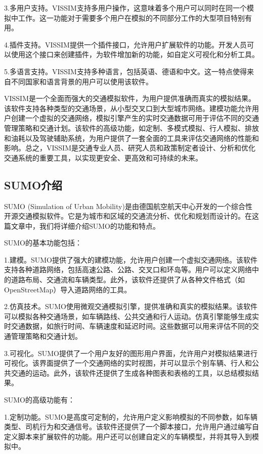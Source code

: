 3.多用户支持。VISSIM支持多用户操作，这意味着多个用户可以同时在同一个模拟中工作。这一功能对于需要多个用户在模拟的不同部分工作的大型项目特别有用。

4.插件支持。VISSIM提供一个插件接口，允许用户扩展软件的功能。开发人员可以使用这个接口来创建插件，为软件增加新的功能，如自定义可视化和分析工具。

5.多语言支持。VISSIM支持多种语言，包括英语、德语和中文。这一特点使得来自不同国家和语言背景的用户可以使用该软件。

VISSIM是一个全面而强大的交通模拟软件，为用户提供准确而真实的模拟结果。该软件支持各种类型的交通场景，从小型交叉口到大型城市网络。建模功能允许用户创建一个虚拟的交通网络，模拟引擎产生的实时交通数据可用于评估不同的交通管理策略和交通计划。该软件的高级功能，如定制、多模式模拟、行人模拟、排放和油耗以及驾驶辅助系统，为用户提供了一套全面的工具来评估交通网络的性能和影响。总之，VISSIM是交通专业人员、研究人员和政策制定者设计、分析和优化交通系统的重要工具，以实现更安全、更高效和可持续的未来。


\subsection{SUMO介绍}

SUMO (Simulation of Urban Mobility)是由德国航空航天中心开发的一个综合性开源交通模拟软件。它是为城市和区域的交通流分析、优化和规划而设计的。在这篇文章中，我们将详细介绍SUMO的功能和特点。

SUMO的基本功能包括：

1.建模。SUMO提供了强大的建模功能，允许用户创建一个虚拟交通网络。该软件支持各种道路网络，包括高速公路、公路、交叉口和环岛等。用户可以定义网络中的道路布局、交通流和车辆类型。此外，该软件还提供了从各种文件格式（如OpenStreetMap）导入道路网络的工具。

2.仿真技术。SUMO使用微观交通模拟引擎，提供准确和真实的模拟结果。该软件可以模拟各种交通场景，如车辆路线、公共交通和行人运动。仿真引擎能够生成实时交通数据，如旅行时间、车辆速度和延迟时间。这些数据可以用来评估不同的交通管理策略和交通计划。

3.可视化。SUMO提供了一个用户友好的图形用户界面，允许用户对模拟结果进行可视化。该界面提供了一个交通网络的实时视图，并可以显示个别车辆、行人和公共交通的运动。此外，该软件还提供了生成各种图表和表格的工具，以总结模拟结果。

SUMO的高级功能有：

1.定制功能。SUMO是高度可定制的，允许用户定义影响模拟的不同参数，如车辆类型、司机行为和交通信号。该软件还提供了一个脚本接口，允许用户通过编写自定义脚本来扩展软件的功能。用户还可以创建自定义的车辆模型，并将其导入到模拟中。

